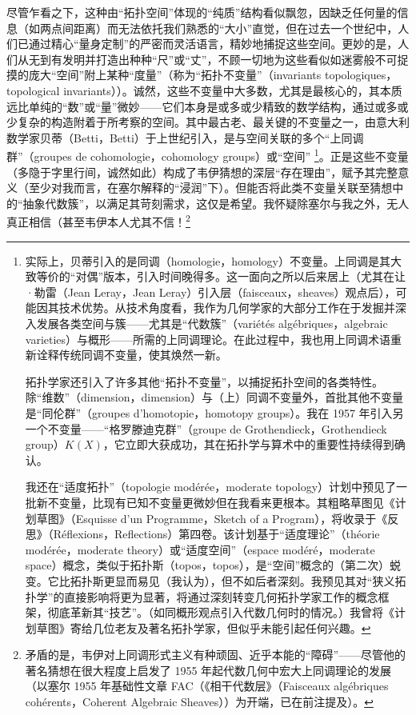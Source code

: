 尽管乍看之下，这种由“拓扑空间”体现的“纯质”结构看似飘忽，因缺乏任何量的信息（如两点间距离）而无法依托我们熟悉的“大小”直觉，但在过去一个世纪中，人们已通过精心“量身定制”的严密而灵活语言，精妙地捕捉这些空间。更妙的是，人们从无到有发明并打造出种种“尺”或“丈”，不顾一切地为这些看似如迷雾般不可捉摸的庞大“空间”附上某种“度量”（称为“拓扑不变量”（invariants topologiques，topological invariants））。诚然，这些不变量中大多数，尤其是最核心的，其本质远比单纯的“数”或“量”微妙——它们本身是或多或少精致的数学结构，通过或多或少复杂的构造附着于所考察的空间。其中最古老、最关键的不变量之一，由意大利数学家贝蒂（Betti，Betti）于上世纪引入，是与空间关联的多个“上同调群”（groupes de cohomologie，cohomology groups）或“空间” \footnote{实际上，贝蒂引入的是同调（homologie，homology）不变量。上同调是其大致等价的“对偶”版本，引入时间晚得多。这一面向之所以后来居上（尤其在让·勒雷（Jean Leray，Jean Leray）引入层（faisceaux，sheaves）观点后），可能因其技术优势。从技术角度看，我作为几何学家的大部分工作在于发掘并深入发展各类空间与簇——尤其是“代数簇”（variétés algébriques，algebraic varieties）与概形——所需的上同调理论。在此过程中，我也用上同调术语重新诠释传统同调不变量，使其焕然一新。

拓扑学家还引入了许多其他“拓扑不变量”，以捕捉拓扑空间的各类特性。除“维数”（dimension，dimension）与（上）同调不变量外，首批其他不变量是“同伦群”（groupes d’homotopie，homotopy groups）。我在 1957 年引入另一个不变量——“格罗滕迪克群”（groupe de Grothendieck，Grothendieck group）$K(X)$，它立即大获成功，其在拓扑学与算术中的重要性持续得到确认。

我还在“适度拓扑”（topologie modérée，moderate topology）计划中预见了一批新不变量，比现有已知不变量更微妙但在我看来更根本。其粗略草图见《计划草图》（Esquisse d’un Programme，Sketch of a Program），将收录于《反思》（Réflexions，Reflections）第四卷。该计划基于“适度理论”（théorie modérée，moderate theory）或“适度空间”（espace modéré，moderate space）概念，类似于拓扑斯（topos，topos），是“空间”概念的（第二次）蜕变。它比拓扑斯更显而易见（我认为），但不如后者深刻。我预见其对“狭义拓扑学”的直接影响将更为显著，将通过深刻转变几何拓扑学家工作的概念框架，彻底革新其“技艺”。（如同概形观点引入代数几何时的情况。）我曾将《计划草图》寄给几位老友及著名拓扑学家，但似乎未能引起任何兴趣。}。正是这些不变量（多隐于字里行间，诚然如此）构成了韦伊猜想的深层“存在理由”，赋予其完整意义（至少对我而言，在塞尔解释的“浸润”下）。但能否将此类不变量关联至猜想中的“抽象代数簇”，以满足其苛刻需求，这仅是希望。我怀疑除塞尔与我之外，无人真正相信（甚至韦伊本人尤其不信！\footnote{矛盾的是，韦伊对上同调形式主义有种顽固、近乎本能的“障碍”——尽管他的著名猜想在很大程度上启发了 1955 年起代数几何中宏大上同调理论的发展（以塞尔 1955 年基础性文章 FAC（《相干代数层》（Faisceaux algébriques cohérents，Coherent Algebraic Sheaves））为开端，已在前注提及）。

}
